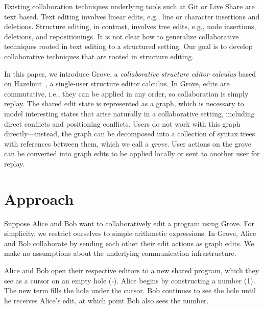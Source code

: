\documentclass[nonacm, acmsmall, screen, review]{acmart}
\newcommand{\hole}{\ensuremath{\square}} %
\begin{document}
Existing collaboration techniques underlying tools such at Git or Live Share are text based.
Text editing involves linear edits, e.g., line or character insertions and deletions.
Structure editing, in contrast, involves tree edits, e.g., node insertions, deletions, and repositionings.
It is not clear how to generalize collaborative techniques rooted in text editing to a structured setting.
Our goal is to develop collaborative techniques that are rooted in structure editing.

In this paper, we introduce Grove, a \emph{collaborative structure editor calculus} based on Hazelnut~\cite{omar_hazelnut_2017}, a single-user structure editor calculus.
In Grove, edits are commutative, i.e., they can be applied in any order, so collaboration is simply replay.
The shared edit state is represented as a graph, which is necessary to model interesting states that arise naturally in a collaborative setting, 
including direct conflicts and positioning conflicts. 
Users do not work with this graph directly---instead, the graph can be decomposed into a collection of syntax trees with references between them, which we call a \emph{grove}.
User actions on the grove can be converted into graph edits to be applied locally or sent to another user for replay.



\section{Approach}


Suppose Alice and Bob want to collaboratively edit a program using Grove.
For simplicity, we restrict ourselves to simple arithmetic expressions.
In Grove, Alice and Bob collaborate by sending each other their edit actions as graph edits.
We make no assumptions about the underlying communication infrastructure.

Alice and Bob open their respective editors to a new shared program,
which they see as a cursor on an empty hole ($\hole$).
Alice begins by constructing a number (1).
The new term fills the hole under the cursor.
Bob continues to see the hole until he receives Alice's edit,
at which point Bob also sees the number.
\end{document}
